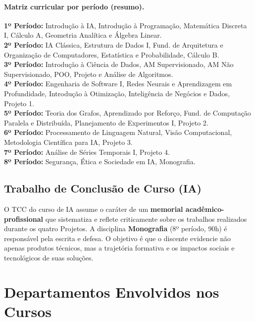 \documentclass[9pt,a4paper]{extarticle}
\begin{document}
\paragraph{Matriz curricular por período (resumo).}

\noindent\colorbox{shadeIA}{\parbox{\dimexpr\linewidth-2\fboxsep}{%
\textbf{1º Período:} Introdução à IA, Introdução à Programação, Matemática Discreta I, Cálculo A, Geometria Analítica e Álgebra Linear.\\
\textbf{2º Período:} IA Clássica, Estrutura de Dados I, Fund. de Arquitetura e Organização de Computadores, Estatística e Probabilidade, Cálculo B.\\
\textbf{3º Período:} Introdução à Ciência de Dados, AM Supervisionado, AM Não Supervisionado, POO, Projeto e Análise de Algoritmos.\\
\textbf{4º Período:} Engenharia de Software I, Redes Neurais e Aprendizagem em Profundidade, Introdução à Otimização, Inteligência de Negócios e Dados, Projeto 1.\\
\textbf{5º Período:} Teoria dos Grafos, Aprendizado por Reforço, Fund. de Computação Paralela e Distribuída, Planejamento de Experimentos I, Projeto 2.\\
\textbf{6º Período:} Processamento de Linguagem Natural, Visão Computacional, Metodologia Científica para IA, Projeto 3.\\
\textbf{7º Período:} Análise de Séries Temporais I, Projeto 4.\\
\textbf{8º Período:} Segurança, Ética e Sociedade em IA, Monografia.
}}

\subsection{Trabalho de Conclusão de Curso (IA)}

O TCC do curso de IA assume o caráter de um \textbf{memorial acadêmico-profissional} que sistematiza e reflete criticamente sobre os trabalhos realizados durante os quatro Projetos. A disciplina \textbf{Monografia} (8º período, 90h) é responsável pela escrita e defesa. O objetivo é que o discente evidencie não apenas produtos técnicos, mas a trajetória formativa e os impactos sociais e tecnológicos de suas soluções.

\section{Departamentos Envolvidos nos Cursos}
\end{document}
